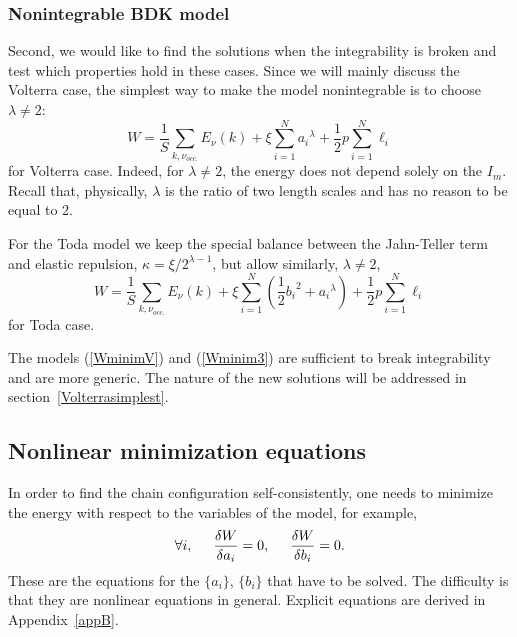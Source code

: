 \documentclass[]{revtex4-1}
\begin{document}
\subsubsection{Nonintegrable BDK model}


Second, we would like to find the solutions when the integrability is broken and test which properties hold in these cases. Since we will mainly discuss  the Volterra case, the simplest way to make the model nonintegrable is to choose $\lambda \neq 2$: 
\begin{equation}
  W= \frac{1}{S}   \sum_{k, \nu_{occ.}} E_{\nu}(k)  +  \xi \sum_{i=1}^{N}  {a_i}^{\lambda}  + \frac{1}{2} p \sum_{i=1}^{N} \ell_i
  \label{WminimV} \end{equation}
for Volterra case.
Indeed, for $\lambda \neq 2$, the energy does not depend solely on the $I_m$. Recall that, physically, $\lambda$ is the ratio of two length scales and has no reason to be equal to 2.

For the Toda model we keep the special balance between the Jahn-Teller term and elastic repulsion, $\kappa=\xi/2^{\lambda-1}$, but allow similarly, $\lambda \neq 2$,
\begin{equation}
W= \frac{1}{S}   \sum_{k, \nu_{occ.}} E_{\nu}(k)  +  \xi \sum_{i=1}^{N} \left(\frac{1}{2}  {b_i}^2+  {a_i}^{\lambda} \right)  + \frac{1}{2} p \sum_{i=1}^{N} \ell_i 
\label{Wminim3} \end{equation}
for Toda case.


The models (\ref{WminimV}) and (\ref{Wminim3}) are sufficient to break integrability and are more generic. The nature of the new solutions will be addressed in section~\ref{Volterrasimplest}.

\subsection{Nonlinear minimization equations} \label{nonlinearminsection}

In order to find  the chain configuration self-consistently, one needs to minimize the energy with respect to the variables of the model, for example,
\begin{eqnarray}
\forall i, \hspace{.5cm}  \frac{\delta W}{\delta a_i} =0, \hspace{.5cm}  \frac{\delta W}{\delta b_i} =0.
\end{eqnarray}
These are the equations for the $\{a_i \}$, $\{b_i \}$ that have to be solved. The difficulty is that they are nonlinear equations in general. Explicit equations are derived in Appendix~\ref{appB}.
\end{document}
